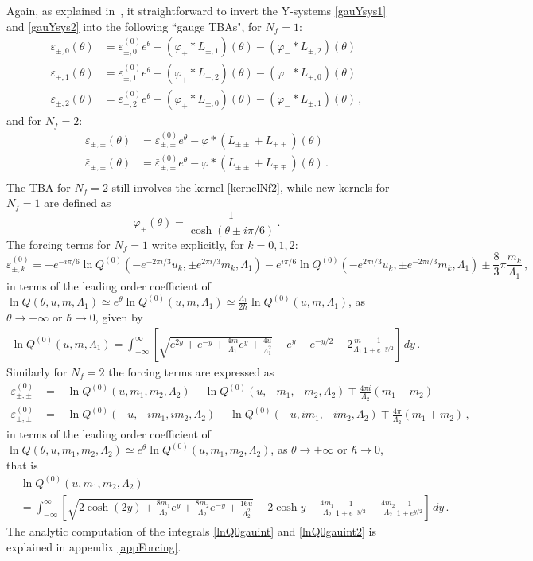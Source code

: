 \documentclass[11pt,a4paper]{elsarticle}
\def \th {\theta}
\def \ve {\varepsilon}
\def \ba {\begin{aligned}}
\def \ea {\end{aligned}}
\newcommand{\be}{\begin{equation}}
\newcommand{\ee}{\end{equation}}
\def\th{\theta}
\numberwithin{figure}{section}
\numberwithin{table}{section}
\begin{document}
 
Again, as explained in~\cite{FabbriFioravantiPiscagliaTateo:2013}, it straightforward to invert the Y-systems \eqref{gauYsys1} and \eqref{gauYsys2} into the following ``gauge TBAs", for $N_f=1$:
\be 
\ba 
\label{ga-TBA}
\ve_{\pm,0}(\th)&=\ve^{(0)}_{\pm,0}e^\theta - \left(\varphi_+ \ast L_{\pm,1}\right)(\th)- \left(\varphi_- \ast L_{\pm,2}\right)(\th) \\
\ve_{\pm,1}(\th)&=\ve^{(0)}_{\pm,1} e^\theta - \left(\varphi_+ \ast L_{\pm,2}\right)(\th)- \left(\varphi_- \ast L_{\pm,0}\right)(\th)\\
\ve_{\pm,2}(\th)&=\ve^{(0)}_{\pm,2} e^\theta - \left(\varphi_+ \ast L_{\pm,0}\right)(\th)- \left(\varphi_- \ast L_{\pm,1}\right)(\th)\,,
\ea 
\ee 
and for $N_f=2$:
\be \label{ga-TBA2}
\ba 
\varepsilon_{\pm,\pm}(\th)&= \varepsilon_{\pm,\pm}^{(0)} e^{\th}- \varphi \ast (\bar{L}_{\pm \pm}+ \bar{L}_{\mp \mp})(\th) \\
\bar{\varepsilon}_{\pm,\pm}(\th)&= \bar{\varepsilon}_{\pm,\pm}^{(0)} e^{\th}- \varphi \ast (L_{\pm \pm}+ L_{\mp \mp})(\th) \,.\\
\ea 
\ee 
The TBA for $N_f=2$ still involves the kernel \eqref{kernelNf2}, while new kernels for $N_f=1$ are defined as
\be \label{kern1}
\varphi_\pm(\th) = \frac{1}{\cosh (\th  \pm i \pi/6)}\,.
\ee 
The forcing terms for $N_f=1$ write explicitly, for $k=0,1,2$:
\be \label{eps0gau}
\ve^{(0)}_{\pm,k}=-e^{-i\pi/6}\ln Q^{(0)}(-e^{-2\pi i/3}u_k,\pm e^{2\pi i/3}m_k,\Lambda_1)-e^{i\pi/6}\ln Q^{(0)}(-e^{2\pi i/3} u_k,\pm e^{-2\pi i/3}m_k,\Lambda_1)\pm\frac{8}{3} \pi  \frac{m_k}{\Lambda_1} \,,
\ee
in terms of the leading order coefficient of $\ln Q(\theta,u,m,\Lambda_1) \simeq e^\theta \ln Q^{(0)}(u,m,\Lambda_1)\simeq \frac{\Lambda_1}{2\hbar} \ln Q^{(0)}(u,m,\Lambda_1)$, as $\theta \to + \infty$ or $\hbar \to 0$, given by
\be \label{lnQ0gauint}
\ba 
\ln Q^{(0)}(u,m,\Lambda_1) = \int_{-\infty}^\infty \left[\sqrt{e^{2y}+e^{-y}+\frac{4 m }{\Lambda_1}e^y+\frac{4u}{\Lambda_1^2}}-e^y-e^{-y/2}-2\frac{m}{\Lambda_1}\frac{1}{1+e^{-y/2}}\right]\,d y\,.
\ea 
\ee 
Similarly for $N_f=2$ the forcing terms are expressed as
\be 
\ba 
 \varepsilon_{\pm,\pm}^{(0)} &=-\ln Q^{(0)}(u, m_1, m_2,\Lambda_2) -\ln Q^{(0)}(u, -m_1, -m_2,\Lambda_2)  \mp \frac{4 \pi i}{\Lambda_2}(m_1-m_2) \\
 \bar{\varepsilon}_{\pm,\pm}^{(0)} &=-\ln Q^{(0)}(-u, -i m_1, i m_2,\Lambda_2) -\ln Q^{(0)}(-u, i m_1, - i m_2,\Lambda_2)  \mp \frac{4 \pi }{\Lambda_2}(m_1+m_2)\,,
\ea
\ee
in terms of the leading order coefficient of $\ln Q(\theta,u,m_1,m_2,\Lambda_2) \simeq e^\theta \ln Q^{(0)}(u,m_1,m_2,\Lambda_2)$, as $\theta \to + \infty$ or $\hbar \to 0$, that is
\begin{align} \label{lnQ0gauint2}
&\ln Q^{(0)}(u,m_1,m_2,\Lambda_2) \nonumber \\
&= \int_{-\infty}^\infty\left[\sqrt{2 \cosh(2 y) +\frac{8 m_1}{ \Lambda_2}e^y+ \frac{8 m_2}{\Lambda_2}e^{-y}+\frac{16 u}{\Lambda_2^2}} -2\cosh y -\frac{4 m_1}{\Lambda_2}\frac{1}{1+e^{-y/2}}- \frac{4 m_2}{\Lambda_2}\frac{1}{1+e^{y/2}}\right]\, dy \,.
\end{align} 
The analytic computation of the integrals \eqref{lnQ0gauint} and \eqref{lnQ0gauint2} is explained in appendix \ref{appForcing}.
\end{document}

